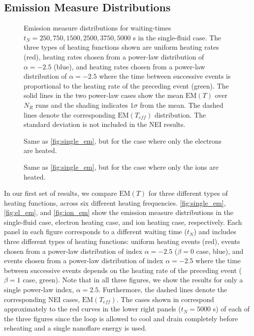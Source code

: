 \documentclass[preprint,linenumbers]{aastex}
\begin{document}
	\subsection{Emission Measure Distributions}
	\label{subsec:em_dist}
	\begin{figure*}[t]
		\caption{Emission measure distributions for waiting-times $t_N=250,750,1500,2500,3750,5000$ s in the single-fluid case. The three types of heating functions shown are uniform heating rates (red), heating rates chosen from a power-law distribution of $\alpha=-2.5$ (blue), and heating rates chosen from a power-law distribution of $\alpha=-2.5$ where the time between successive events is proportional to the heating rate of the preceding event (green). The solid lines in the two power-law cases show the mean $\mathrm{EM}(T)$ over $N_R$ runs and the shading indicates $1\sigma$ from the mean. The dashed lines denote the corresponding $\mathrm{EM}(T_{eff})$ distribution. The standard deviation is not included in the NEI results.}
		\label{fig:single_em}
	\end{figure*}
	\begin{figure*}[t]
		\caption{Same as \autoref{fig:single_em}, but for the case where only the electrons are heated.}
		\label{fig:el_em}
	\end{figure*}
	\begin{figure*}
		\caption{Same as \autoref{fig:single_em}, but for the case where only the ions are heated.}
		\label{fig:ion_em}
	\end{figure*}
	\par In our first set of results, we compare $\mathrm{EM}(T)$ for three different types of heating functions, across six different heating frequencies. \autoref{fig:single_em}, \autoref{fig:el_em}, and \autoref{fig:ion_em} show the emission measure distributions in the single-fluid case, electron heating case, and ion heating case, respectively. Each panel in each figure corresponds to a different waiting time ($t_N$) and includes three different types of heating functions: uniform heating events (red), events chosen from a power-law distribution of index $\alpha=-2.5$ ($\beta=0$ case, blue), and events chosen from a power-law distribution of index $\alpha=-2.5$ where the time between successive events depends on the heating rate of the preceding event ($\beta=1$ case, green). Note that in all three figures, we show the results for only a single power-law index, $\alpha=2.5$. Furthermore, the dashed lines denote the corresponding NEI cases, $\mathrm{EM}(T_{eff})$. The cases shown in  correspond approximately to the red curves in the lower right panels ($t_N=5000$ s) of each of the three figures since the loop is allowed to cool and drain completely before reheating and a single nanoflare energy is used. 
\end{document}
